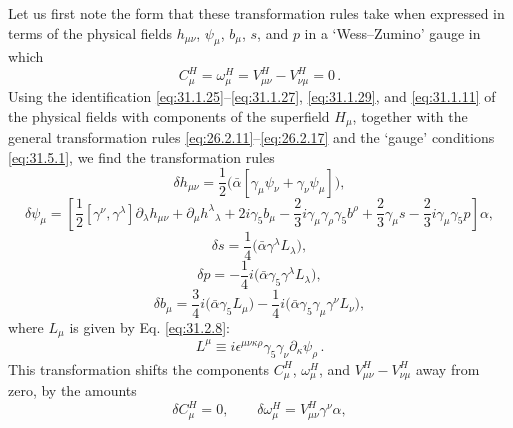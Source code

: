 Let us first note the form that these transformation rules take when
expressed in terms of the physical fields \(h_{\mu\nu}\), \(\psi_\mu\),
\(b_\mu\), \(s\), and \(p\) in a `Wess--Zumino' gauge in which
\begin{equation}
  C_\mu^H=\omega_\mu^H=V_{\mu\nu}^H-V_{\nu\mu}^H=0\,.
  \tag{31.5.1}\label{eq:31.5.1}
\end{equation}
Using the identification \eqref{eq:31.1.25}--\eqref{eq:31.1.27},
\eqref{eq:31.1.29}, and \eqref{eq:31.1.11} of the physical fields with
components of the superfield \(H_\mu\), together with the general
transformation rules \eqref{eq:26.2.11}--\eqref{eq:26.2.17} and the
`gauge' conditions \eqref{eq:31.5.1}, we find the transformation rules
\begin{equation}
  \delta h_{\mu\nu}
  =\frac{1}{2}\bigl(\bar\alpha
    [\gamma_\mu\psi_\nu+\gamma_\nu\psi_\mu]\bigr),
  \tag{31.5.2}\label{eq:31.5.2}
\end{equation}
\begin{equation}
  \delta\psi_\mu
  =\left[
      \frac{1}{2}[\gamma^\nu,\gamma^\lambda]\partial_\lambda h_{\mu\nu}
      +\partial_\mu h^\lambda{}_\lambda
      +2i\gamma_5b_\mu
      -\frac{2}{3}i\gamma_\mu\gamma_\rho\gamma_5b^\rho
      +\frac{2}{3}\gamma_\mu s
      -\frac{2}{3}i\gamma_\mu\gamma_5p
    \right]\alpha,
  \tag{31.5.3}\label{eq:31.5.3}
\end{equation}
\begin{equation}
  \delta s=\frac{1}{4}\bigl(\bar\alpha\gamma^\lambda L_\lambda\bigr),
  \tag{31.5.4}\label{eq:31.5.4}
\end{equation}
\begin{equation}
  \delta p=-\frac{1}{4}i
    \bigl(\bar\alpha\gamma_5\gamma^\lambda L_\lambda\bigr),
  \tag{31.5.5}\label{eq:31.5.5}
\end{equation}
\begin{equation}
  \delta b_\mu
  =\frac{3}{4}i\bigl(\bar\alpha\gamma_5L_\mu\bigr)
   -\frac{1}{4}i
    \bigl(\bar\alpha\gamma_5\gamma_\mu\gamma^\nu L_\nu\bigr),
  \tag{31.5.6}\label{eq:31.5.6}
\end{equation}
where \(L_\mu\) is given by Eq. \eqref{eq:31.2.8}:
\[
  L^\mu\equiv
  i\epsilon^{\mu\nu\kappa\rho}\gamma_5\gamma_\nu
  \partial_\kappa\psi_\rho\,.
\]
This transformation shifts the components \(C_\mu^H\), \(\omega_\mu^H\),
and \(V_{\mu\nu}^H-V_{\nu\mu}^H\) away from zero, by the amounts
\begin{equation}
  \delta C_\mu^H=0,\qquad
  \delta\omega_\mu^H=V_{\mu\nu}^H\gamma^\nu\alpha,
  \tag{31.5.7}\label{eq:31.5.7}
\end{equation}
